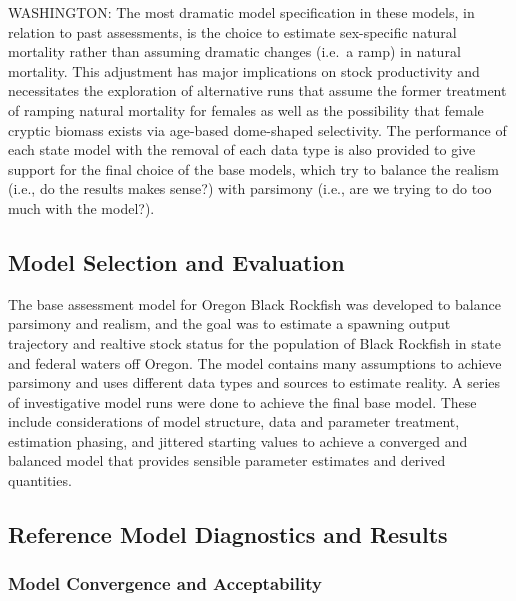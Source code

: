 \documentclass[11pt,
  english,
  letterpaper,
]{article}
\begin{document}
WASHINGTON: The most dramatic model specification in these models, in relation to past assessments, is the choice to estimate sex-specific natural mortality rather than assuming dramatic changes (i.e.~a ramp) in natural mortality. This adjustment has major implications on stock productivity and necessitates the exploration of alternative runs that assume the former treatment of ramping natural mortality for females as well as the possibility that female cryptic biomass exists via age-based dome-shaped selectivity. The performance of each state model with the removal of each data type is also provided to give support for the final choice of the base models, which try to balance the realism (i.e., do the results makes sense?) with parsimony (i.e., are we trying to do too much with the model?).

\hypertarget{model-selection-and-evaluation}{%
\subsection{Model Selection and Evaluation}\label{model-selection-and-evaluation}}

The base assessment model for Oregon Black Rockfish was developed to balance parsimony and realism, and the goal was to estimate a spawning output trajectory and realtive stock status for the population of Black Rockfish in state and federal waters off Oregon. The model contains many assumptions to achieve parsimony and uses different data types and sources to estimate reality. A series of investigative model runs were done to achieve the final base model. These include considerations of model structure, data and parameter treatment, estimation phasing, and jittered starting values to achieve a converged and balanced model that provides sensible parameter estimates and derived quantities.

\hypertarget{reference-model-diagnostics-and-results}{%
\subsection{Reference Model Diagnostics and Results}\label{reference-model-diagnostics-and-results}}

\hypertarget{model-convergence-and-acceptability}{%
\subsubsection{Model Convergence and Acceptability}\label{model-convergence-and-acceptability}}
\end{document}
